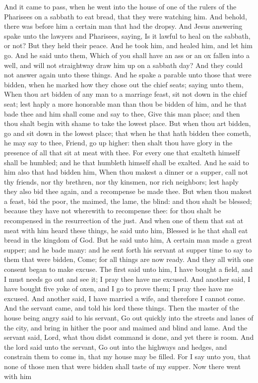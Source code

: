 And it came to pass, when he went into the house of one of the rulers of the Pharisees on a sabbath to eat bread, that they were watching him. And behold, there was before him a certain man that had the dropsy. And Jesus answering spake unto the lawyers and Pharisees, saying, Is it lawful to heal on the sabbath, or not? But they held their peace. And he took him, and healed him, and let him go. And he said unto them, Which of you shall have an ass or an ox fallen into a well, and will not straightway draw him up on a sabbath day? And they could not answer again unto these things.  And he spake a parable unto those that were bidden, when he marked how they chose out the chief seats; saying unto them, When thou art bidden of any man to a marriage feast, sit not down in the chief seat; lest haply a more honorable man than thou be bidden of him, and he that bade thee and him shall come and say to thee, Give this man place; and then thou shalt begin with shame to take the lowest place. But when thou art bidden, go and sit down in the lowest place; that when he that hath bidden thee cometh, he may say to thee, Friend, go up higher: then shalt thou have glory in the presence of all that sit at meat with thee. For every one that exalteth himself shall be humbled; and he that humbleth himself shall be exalted.  And he said to him also that had bidden him, When thou makest a dinner or a supper, call not thy friends, nor thy brethren, nor thy kinsmen, nor rich neighbors; lest haply they also bid thee again, and a recompense be made thee. But when thou makest a feast, bid the poor, the maimed, the lame, the blind: and thou shalt be blessed; because they have not wherewith to recompense thee: for thou shalt be recompensed in the resurrection of the just.  And when one of them that sat at meat with him heard these things, he said unto him, Blessed is he that shall eat bread in the kingdom of God. But he said unto him, A certain man made a great supper; and he bade many: and he sent forth his servant at supper time to say to them that were bidden, Come; for all things are now ready. And they all with one consent began to make excuse. The first said unto him, I have bought a field, and I must needs go out and see it; I pray thee have me excused. And another said, I have bought five yoke of oxen, and I go to prove them; I pray thee have me excused. And another said, I have married a wife, and therefore I cannot come. And the servant came, and told his lord these things. Then the master of the house being angry said to his servant, Go out quickly into the streets and lanes of the city, and bring in hither the poor and maimed and blind and lame. And the servant said, Lord, what thou didst command is done, and yet there is room. And the lord said unto the servant, Go out into the highways and hedges, and constrain them to come in, that my house may be filled. For I say unto you, that none of those men that were bidden shall taste of my supper.  Now there went with him 